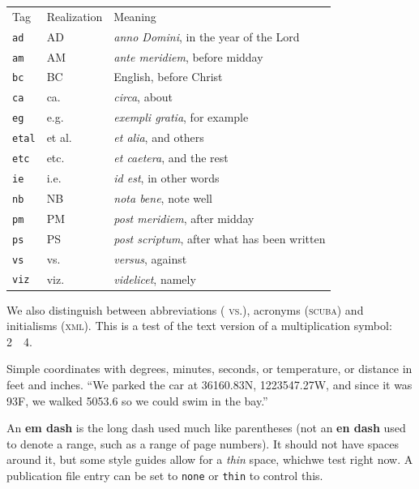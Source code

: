 \documentclass{amsart}
\theoremstyle{plain}%
\theoremstyle{definition}%
\theoremstyle{remark}%
\newcommand{\tabularfont}{\relax}
\newcommand{\mono}[1]{\texttt{#1}}
\newcommand{\initialism}[1]{\textsc{\MakeLowercase{#1}}}
\newcommand{\acronym}[1]{\textsc{\MakeLowercase{#1}}}
\newcommand{\abbreviation}[1]{%
\textsc{\MakeLowercase{#1}}}
\newcommand{\terminology}[1]{\textbf{#1}}
\numberwithin{equation}{section}
\begin{document}
\begin{center}%
{\tabularfont%
\begin{tabular}{lll}
Tag&Realization&Meaning\tabularnewline[0pt]
\mono{ad}&AD&\textit{anno Domini}, in the year of the Lord\tabularnewline[0pt]
\mono{am}&AM&\textit{ante meridiem}, before midday\tabularnewline[0pt]
\mono{bc}&BC&English, before Christ\tabularnewline[0pt]
\mono{ca}&ca.\@&\textit{circa}, about\tabularnewline[0pt]
\mono{eg}&e.g.\@&\textit{exempli gratia}, for example\tabularnewline[0pt]
\mono{etal}&et al.\@&\textit{et alia}, and others\tabularnewline[0pt]
\mono{etc}&etc.\@&\textit{et caetera}, and the rest\tabularnewline[0pt]
\mono{ie}&i.e.\@&\textit{id est}, in other words\tabularnewline[0pt]
\mono{nb}&NB&\textit{nota bene}, note well\tabularnewline[0pt]
\mono{pm}&PM&\textit{post meridiem}, after midday\tabularnewline[0pt]
\mono{ps}&PS&\textit{post scriptum}, after what has been written\tabularnewline[0pt]
\mono{vs}&vs.\@&\textit{versus}, against\tabularnewline[0pt]
\mono{viz}&viz.\@&\textit{videlicet}, namely
\end{tabular}
}%
\end{center}%
We also distinguish between abbreviations (\abbreviation{vs.}), acronyms (\acronym{SCUBA}) and initialisms (\initialism{XML}).  This is a test of the text version of a multiplication symbol: 2~\texttimes{}~4.%
\par
Simple coordinates with degrees, minutes, seconds, or temperature, or distance in feet and inches.  ``We parked the car at 36\textdegree{}16\textquotesingle{}0.83\textquotesingle\textquotesingle{}N, 122\textdegree{}35\textquotesingle{}47.27\textquotesingle\textquotesingle{}W, and since it was 93\textdegree{}F, we walked 505\textquotesingle{}3.6\textquotesingle\textquotesingle{} so we could swim in the bay.''%
\par
An \terminology{em dash} is the long dash used much like parentheses (not an \terminology{en dash} used to denote a range, such as a range of page numbers).  It should not have spaces around it, but some style guides allow for a \emph{thin} space, which\textemdash{}we test right now.  A publication file entry can be set to \mono{none} or \mono{thin} to control this.%
%
%
\typeout{************************************************}
\typeout{************************************************}
%
\end{document}
